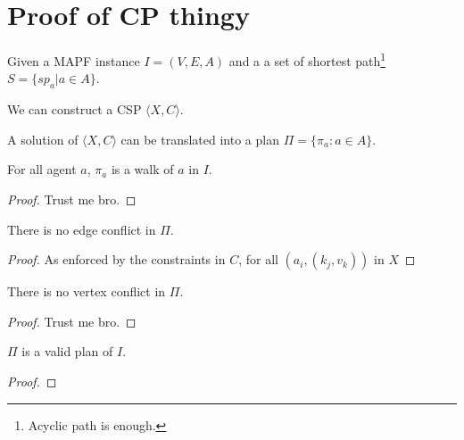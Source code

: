\section{Proof of CP thingy}

Given a MAPF instance $I=(V,E,A)$ and a a set of shortest path\footnote{Acyclic path is enough.} $S = \{sp_a | a \in A \}$.

We can construct a CSP $\langle X,C \rangle$.

A solution of $\langle X,C \rangle$ can be translated into a plan $\Pi = \{\pi_a : a \in A\}$.


  \begin{lemma}
    For all agent $a$, $\pi_a$ is a walk of $a$ in $I$.
  \end{lemma}
  \begin{proof}
    Trust me bro.
  \end{proof}
  \begin{lemma}
    There is no edge conflict in $\Pi$.
  \end{lemma}
  \begin{proof}
    As enforced by the constraints in $C$, for all $(a_i,(k_j,v_k))$ in $X$
  \end{proof}
  \begin{lemma}
    There is no vertex conflict in $\Pi$.
  \end{lemma}
  \begin{proof}
    Trust me bro.
  \end{proof}

\begin{theorem}
$\Pi$ is a valid plan of $I$.
\end{theorem}

\begin{proof}
\end{proof}
